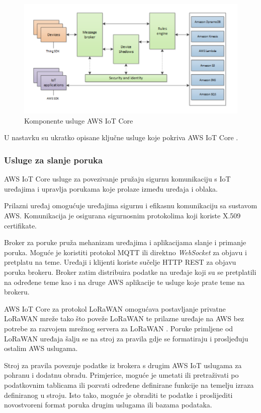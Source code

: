 \begin{figure}[ht]
	\centering
	\includegraphics[scale=0.6]{imgs/aws_iot_core_components}
	\caption{Komponente usluge AWS IoT Core \cite{aws_docs}}
	\label{fig:aws_iot_core_components}
\end{figure}

U nastavku su ukratko opisane ključne usluge koje pokriva AWS IoT Core \cite{aws_docs}.

\subsubsection{Usluge za slanje poruka}

AWS IoT Core usluge za povezivanje pružaju sigurnu komunikaciju s IoT uređajima i upravlja porukama koje prolaze između uređaja i oblaka.

Prilazni uređaj omogućuje uređajima sigurnu i efikasnu komunikaciju sa sustavom AWS. Komunikacija je osigurana sigurnosnim protokolima koji koriste  X.509 certifikate. 

Broker za poruke pruža mehanizam uređajima i aplikacijama slanje i primanje poruka. Moguće je koristiti protokol MQTT ili direktno \textit{WebSocket} za objavu i pretplatu na teme. Uređaji i klijenti koriste sučelje HTTP REST za objavu poruka brokeru. Broker zatim distribuira podatke na uređaje koji su se pretplatili na određene teme kao i na druge AWS aplikacije te usluge koje prate teme na brokeru.

AWS IoT Core za protokol LoRaWAN omogućava postavljanje privatne LoRaWAN mreže tako što poveže LoRaWAN te prilazne uređaje na AWS bez potrebe za razvojem mrežnog servera za LoRaWAN . Poruke primljene od LoRaWAN uređaja šalju se na stroj za pravila  gdje se formatiraju i prosljeđuju ostalim AWS uslugama.

Stroj za pravila  povezuje podatke iz brokera s drugim AWS IoT uslugama za pohranu i dodatnu obradu. Primjerice, moguće je umetati ili pretraživati po podatkovnim tablicama ili pozvati određene definirane funkcije na temelju izraza definiranog u stroju. Isto tako, moguće je obraditi te podatke i proslijediti novostvoreni format poruka drugim uslugama ili bazama podataka.

